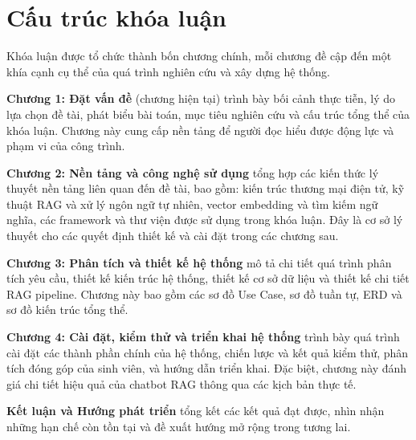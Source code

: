 \section{Cấu trúc khóa luận}
\label{sec:c1_structure}

Khóa luận được tổ chức thành bốn chương chính, mỗi chương đề cập đến một khía cạnh cụ thể của quá trình nghiên cứu và xây dựng hệ thống.

\textbf{Chương 1: Đặt vấn đề} (chương hiện tại) trình bày bối cảnh thực tiễn, lý do lựa chọn đề tài, phát biểu bài toán, mục tiêu nghiên cứu và cấu trúc tổng thể của khóa luận. Chương này cung cấp nền tảng để người đọc hiểu được động lực và phạm vi của công trình.

\textbf{Chương 2: Nền tảng và công nghệ sử dụng} tổng hợp các kiến thức lý thuyết nền tảng liên quan đến đề tài, bao gồm: kiến trúc thương mại điện tử, kỹ thuật RAG và xử lý ngôn ngữ tự nhiên, vector embedding và tìm kiếm ngữ nghĩa, các framework và thư viện được sử dụng trong khóa luận. Đây là cơ sở lý thuyết cho các quyết định thiết kế và cài đặt trong các chương sau.

\textbf{Chương 3: Phân tích và thiết kế hệ thống} mô tả chi tiết quá trình phân tích yêu cầu, thiết kế kiến trúc hệ thống, thiết kế cơ sở dữ liệu và thiết kế chi tiết RAG pipeline. Chương này bao gồm các sơ đồ Use Case, sơ đồ tuần tự, ERD và sơ đồ kiến trúc tổng thể.

\textbf{Chương 4: Cài đặt, kiểm thử và triển khai hệ thống} trình bày quá trình cài đặt các thành phần chính của hệ thống, chiến lược và kết quả kiểm thử, phân tích đóng góp của sinh viên, và hướng dẫn triển khai. Đặc biệt, chương này đánh giá chi tiết hiệu quả của chatbot RAG thông qua các kịch bản thực tế.

\textbf{Kết luận và Hướng phát triển} tổng kết các kết quả đạt được, nhìn nhận những hạn chế còn tồn tại và đề xuất hướng mở rộng trong tương lai.
